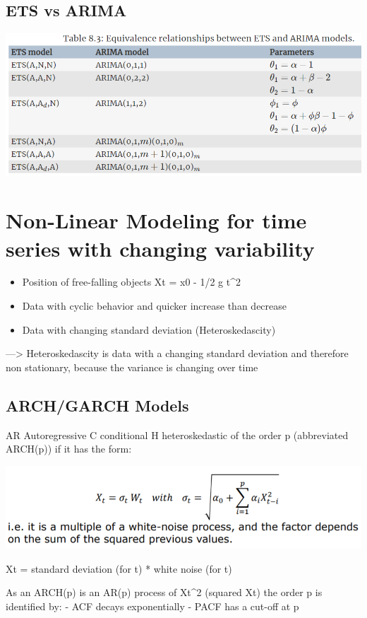 \documentclass[
]{article}
\providecommand{\tightlist}{%
  \setlength{\itemsep}{0pt}\setlength{\parskip}{0pt}}
\begin{document}
\hypertarget{ets-vs-arima}{%
\subsection{ETS vs ARIMA}\label{ets-vs-arima}}

\includegraphics[width=0.5\linewidth]{ets_arima}

\hypertarget{non-linear-modeling-for-time-series-with-changing-variability}{%
\section{Non-Linear Modeling for time series with changing
variability}\label{non-linear-modeling-for-time-series-with-changing-variability}}

\begin{itemize}
\tightlist
\item
  Position of free-falling objects Xt = x0 - 1/2 g t\^{}2
\item
  Data with cyclic behavior and quicker increase than decrease
\item
  Data with changing standard deviation (Heteroskedascity)
\end{itemize}

---\textgreater{} Heteroskedascity is data with a changing standard
deviation and therefore non stationary, because the variance is changing
over time

\hypertarget{archgarch-models}{%
\subsection{ARCH/GARCH Models}\label{archgarch-models}}

AR Autoregressive C conditional H heteroskedastic of the order p
(abbreviated ARCH(p)) if it has the form:

\includegraphics[width=0.5\linewidth]{arch}

Xt = standard deviation (for t) * white noise (for t)

As an ARCH(p) is an AR(p) process of Xt\^{}2 (squared Xt) the order p is
identified by: - ACF decays exponentially - PACF has a cut-off at p
\end{document}
